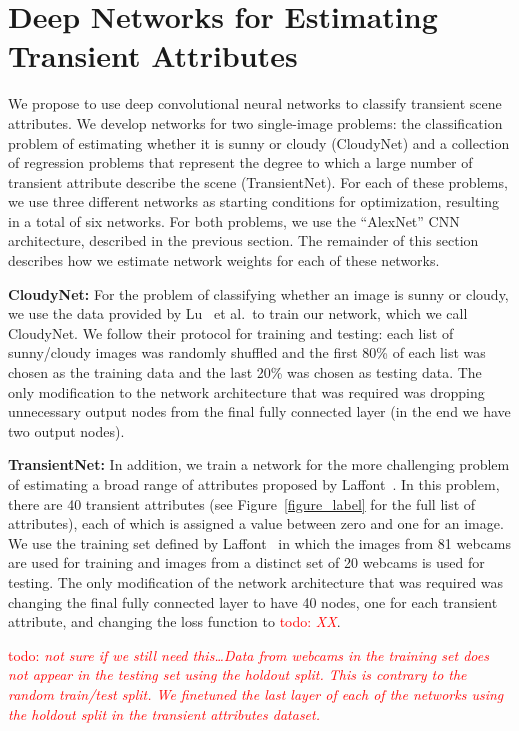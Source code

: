 \documentclass{article}
\newcommand{\todo}[1]{\textcolor{red}{todo: {\em #1}}}
\begin{document}
\section{Deep Networks for Estimating Transient Attributes}

We propose to use deep convolutional neural networks to classify
transient scene attributes. We develop networks for two single-image
problems: the classification problem of estimating whether it is sunny
or cloudy (CloudyNet) and a collection of regression problems that
represent the degree to which a large number of transient attribute
describe the scene (TransientNet).  For each of these problems, we
use three different networks as starting conditions for optimization,
resulting in a total of six networks.  For both problems, we use the
``AlexNet'' CNN architecture, described in the previous section.  The
remainder of this section describes how we estimate network weights
for each of these networks.

\textbf{CloudyNet:} For the problem of classifying whether an image is
sunny or cloudy, we use the data provided by Lu~\cite{lutwoclass} et
al.\ to train our network, which we call CloudyNet.  We follow their
protocol for training and testing: each list of sunny/cloudy images
was randomly shuffled and the first 80\% of each list was chosen as
the training data and the last 20\% was chosen as testing data.  The
only modification to the network architecture that was required was
dropping unnecessary output nodes from the final fully connected layer
(in the end we have two output nodes).

\textbf{TransientNet:} In addition, we train a network for the more
challenging problem of estimating a broad range of attributes proposed
by Laffont~\cite{Laffont14}.  In this problem, there are 40 transient
attributes (see Figure~\ref{figure_label} for the full list of
attributes), each of which is assigned a value between zero and one
for an image. We use the training set defined by
Laffont~\cite{Laffont14} in which the images from 81 webcams are used
for training and images from a distinct set of 20 webcams is used for
testing.  The only modification of the network architecture that was
required was changing the final fully connected layer to have 40
nodes, one for each transient attribute, and changing the loss
function to \todo{XX}. 

\todo{not sure if we still need this\dots Data from webcams in the
training set does not appear in the testing set using the holdout
split.  This is contrary to the random train/test split.  We finetuned
the last layer of each of the networks using the holdout split in the
transient attributes dataset.}
\end{document}
